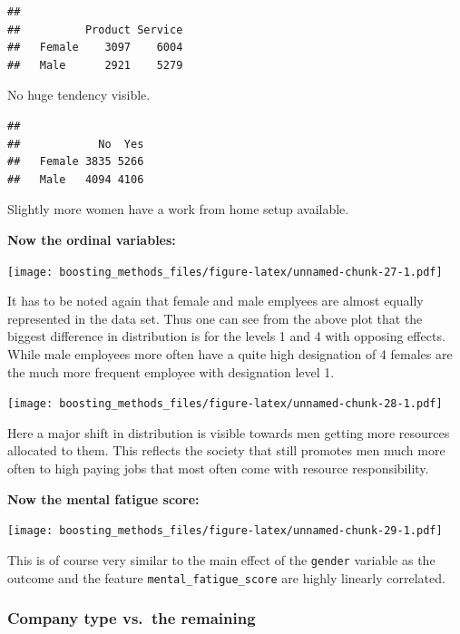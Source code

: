 \documentclass[
]{book}
\newenvironment{Shaded}{\begin{snugshade}}{\end{snugshade}}
\newcommand{\CommentTok}[1]{\textcolor[rgb]{0.56,0.35,0.01}{\textit{#1}}}
\newcommand{\FunctionTok}[1]{\textcolor[rgb]{0.00,0.00,0.00}{#1}}
\newcommand{\NormalTok}[1]{#1}
\newcommand{\SpecialCharTok}[1]{\textcolor[rgb]{0.00,0.00,0.00}{#1}}
\begin{document}
\begin{verbatim}
##         
##          Product Service
##   Female    3097    6004
##   Male      2921    5279
\end{verbatim}

No huge tendency visible.

\begin{Shaded}
\end{Shaded}

\begin{verbatim}
##         
##            No  Yes
##   Female 3835 5266
##   Male   4094 4106
\end{verbatim}

Slightly more women have a work from home setup available.

\textbf{Now the ordinal variables:}

\texttt{[image: boosting\_methods\_files/figure-latex/unnamed-chunk-27-1.pdf]}

It has to be noted again that female and male emplyees are almost equally represented in the data set. Thus one can see from the above plot that the biggest difference in distribution is for the levels 1 and 4 with opposing effects. While male employees more often have a quite high designation of 4 females are the much more frequent employee with designation level 1.

\texttt{[image: boosting\_methods\_files/figure-latex/unnamed-chunk-28-1.pdf]}

Here a major shift in distribution is visible towards men getting more resources allocated to them. This reflects the society that still promotes men much more often to high paying jobs that most often come with resource responsibility.

\textbf{Now the mental fatigue score:}

\texttt{[image: boosting\_methods\_files/figure-latex/unnamed-chunk-29-1.pdf]}

This is of course very similar to the main effect of the \texttt{gender} variable as the outcome and the feature \texttt{mental\_fatigue\_score} are highly linearly correlated.

\hypertarget{company-type-vs.-the-remaining}{%
\subsubsection{Company type vs.~the remaining}\label{company-type-vs.-the-remaining}}
\end{document}

